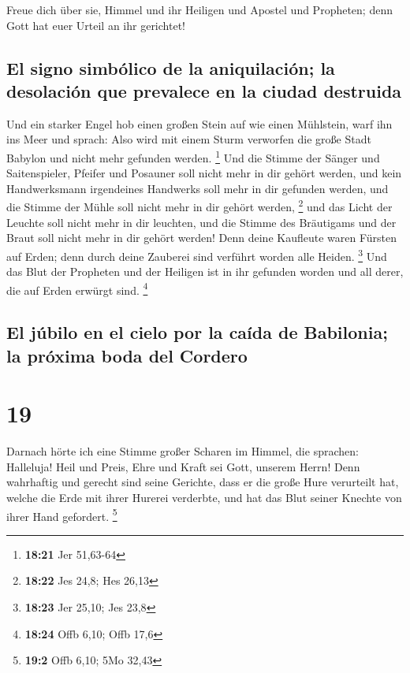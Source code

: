  Freue dich über sie, Himmel und ihr Heiligen und Apostel
und Propheten; denn Gott hat euer Urteil an ihr gerichtet!

\hypertarget{el-signo-simbuxf3lico-de-la-aniquilaciuxf3n-la-desolaciuxf3n-que-prevalece-en-la-ciudad-destruida}{%
\subsection{El signo simbólico de la aniquilación; la desolación que
prevalece en la ciudad
destruida}\label{el-signo-simbuxf3lico-de-la-aniquilaciuxf3n-la-desolaciuxf3n-que-prevalece-en-la-ciudad-destruida}}

 Und ein starker Engel hob einen großen Stein auf wie
einen Mühlstein, warf ihn ins Meer und sprach: Also wird mit einem Sturm
verworfen die große Stadt Babylon und nicht mehr gefunden werden.
\footnote{\textbf{18:21} Jer 51,63-64}  Und die Stimme
der Sänger und Saitenspieler, Pfeifer und Posauner soll nicht mehr in
dir gehört werden, und kein Handwerksmann irgendeines Handwerks soll
mehr in dir gefunden werden, und die Stimme der Mühle soll nicht mehr in
dir gehört werden, \footnote{\textbf{18:22} Jes 24,8; Hes 26,13}
 und das Licht der Leuchte soll nicht mehr in dir
leuchten, und die Stimme des Bräutigams und der Braut soll nicht mehr in
dir gehört werden! Denn deine Kaufleute waren Fürsten auf Erden; denn
durch deine Zauberei sind verführt worden alle Heiden. \footnote{\textbf{18:23}
  Jer 25,10; Jes 23,8}  Und das Blut der Propheten und
der Heiligen ist in ihr gefunden worden und all derer, die auf Erden
erwürgt sind. \footnote{\textbf{18:24} Offb 6,10; Offb 17,6}

\hypertarget{el-juxfabilo-en-el-cielo-por-la-cauxedda-de-babilonia-la-pruxf3xima-boda-del-cordero}{%
\subsection{El júbilo en el cielo por la caída de Babilonia; la próxima
boda del
Cordero}\label{el-juxfabilo-en-el-cielo-por-la-cauxedda-de-babilonia-la-pruxf3xima-boda-del-cordero}}

\hypertarget{section-18}{%
\section{19}\label{section-18}}

 Darnach hörte ich eine Stimme großer Scharen im Himmel,
die sprachen: Halleluja! Heil und Preis, Ehre und Kraft sei Gott,
unserem Herrn!  Denn wahrhaftig und gerecht sind seine
Gerichte, dass er die große Hure verurteilt hat, welche die Erde mit
ihrer Hurerei verderbte, und hat das Blut seiner Knechte von ihrer Hand
gefordert. \footnote{\textbf{19:2} Offb 6,10; 5Mo 32,43}

